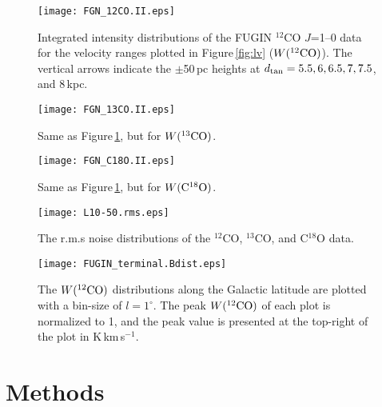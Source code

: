 \documentclass[proof]{pasj01}
\begin{document}
\begin{figure}
 \begin{center}
  \texttt{[image: FGN\_12CO.II.eps]}
 \end{center}
 \caption{Integrated intensity distributions of the FUGIN $^{12}$CO $J$=1--0 data for the velocity ranges plotted in Figure\,\ref{fig:lv} ($W({\rm ^{12}CO})$). The vertical arrows indicate the $\pm$50\,pc heights at $d_{\rm tan} = 5.5, 6, 6.5, 7, 7.5$, and $8$\,kpc. }\label{fig:lb12}
\end{figure}



\begin{figure}
 \begin{center}
  \texttt{[image: FGN\_13CO.II.eps]}
 \end{center}
 \caption{Same as Figure\,\ref{fig:lb12}, but for $W({\rm ^{13}CO})$.}\label{fig:lb13}
\end{figure}


\begin{figure}
 \begin{center}
  \texttt{[image: FGN\_C18O.II.eps]}
 \end{center}
 \caption{Same as Figure\,\ref{fig:lb12}, but for $W({\rm C^{18}O})$.}\label{fig:lb18}
\end{figure}


\begin{figure}
 \begin{center}
  \texttt{[image: L10-50.rms.eps]}
 \end{center}
 \caption{The r.m.s noise distributions of the $^{12}$CO, $^{13}$CO, and C$^{18}$O data. }\label{fig:rms}
\end{figure}

\begin{figure}
 \begin{center}
  \texttt{[image: FUGIN\_terminal.Bdist.eps]}
 \end{center}
 \caption{The $W({\rm ^{12}CO})$ distributions along the Galactic latitude are plotted with a bin-size of $l=1^\circ$. The peak $W({\rm ^{12}CO})$ of each plot is normalized to 1, and the peak value is presented at the top-right of the plot in K\,km\,s$^{-1}$.}\label{fig:bdist}
\end{figure}



\section{Methods}
\end{document}
